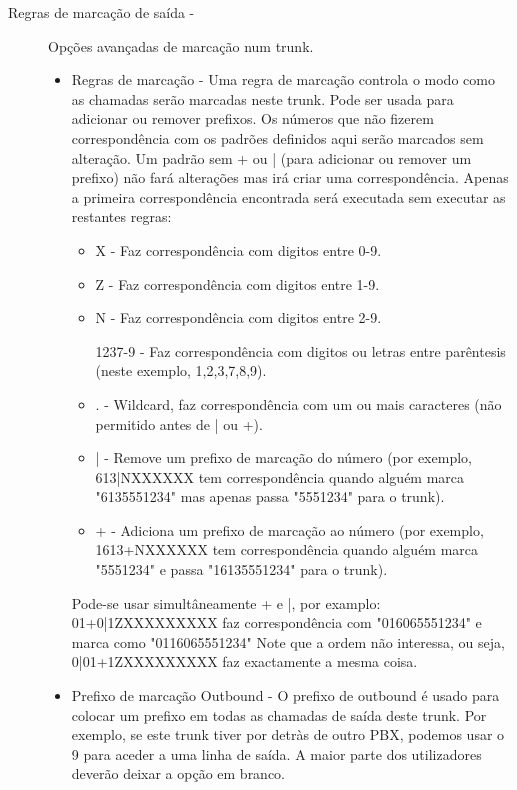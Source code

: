 \begin{description}
\begin{description}
            \item[Regras de marcação de saída -] Opções avançadas de marcação num trunk.
                \begin{itemize}
                    \item Regras de marcação - Uma regra de marcação controla o modo como as chamadas serão marcadas neste trunk. Pode ser usada para adicionar ou remover prefixos. Os números que não fizerem correspondência com os padrões definidos aqui serão marcados sem alteração. Um padrão sem + ou | (para adicionar ou remover um prefixo) não fará alterações mas irá criar uma correspondência. Apenas a primeira correspondência encontrada será executada sem executar as restantes regras:
                        \begin{itemize}
                            \item X - Faz correspondência com digitos entre 0-9.
                            \item Z - Faz correspondência com digitos entre 1-9.
                            \item N - Faz correspondência com digitos entre 2-9.
                            \item [1237-9] - Faz correspondência com digitos ou letras entre parêntesis (neste exemplo, 1,2,3,7,8,9).
                            \item . - Wildcard, faz correspondência com um ou mais caracteres (não permitido antes de | ou +).
                            \item | - Remove um prefixo de marcação do número (por exemplo, 613|NXXXXXX tem correspondência quando alguém marca "6135551234" mas apenas passa "5551234" para o trunk).
                            \item + - Adiciona um prefixo de marcação ao número (por exemplo, 1613+NXXXXXX tem correspondência quando alguém marca "5551234" e passa "16135551234" para o trunk).
                        \end{itemize}
                        Pode-se usar simultâneamente + e |, por examplo: 01+0|1ZXXXXXXXXX faz correspondência com "016065551234" e marca como "0116065551234" Note que a ordem não interessa, ou seja, 0|01+1ZXXXXXXXXX faz exactamente a mesma coisa.

                    \item Prefixo de marcação Outbound - O prefixo de outbound é usado para colocar um prefixo em todas as chamadas de saída deste trunk. Por exemplo, se este trunk tiver por detràs de outro PBX, podemos usar o 9 para aceder a uma linha de saída. A maior parte dos utilizadores deverão deixar a opção em branco.
                \end{itemize}
        \end{description}
\end{description}


